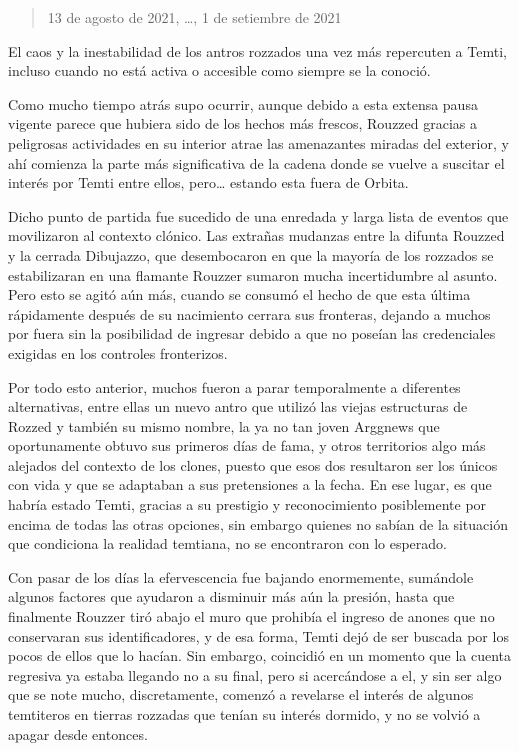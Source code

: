 \documentclass[
  spanish,
]{book}
\begin{document}
\begin{quote}
13 de agosto de 2021, \ldots, 1 de setiembre de 2021
\end{quote}

El caos y la inestabilidad de los antros rozzados una vez más repercuten a Temti, incluso cuando no está activa o accesible como siempre se la conoció.

Como mucho tiempo atrás supo ocurrir, aunque debido a esta extensa pausa vigente parece que hubiera sido de los hechos más frescos, Rouzzed gracias a peligrosas actividades en su interior atrae las amenazantes miradas del exterior, y ahí comienza la parte más significativa de la cadena donde se vuelve a suscitar el interés por Temti entre ellos, pero\ldots{} estando esta fuera de Orbita.

Dicho punto de partida fue sucedido de una enredada y larga lista de eventos que movilizaron al contexto clónico. Las extrañas mudanzas entre la difunta Rouzzed y la cerrada Dibujazzo, que desembocaron en que la mayoría de los rozzados se estabilizaran en una flamante Rouzzer sumaron mucha incertidumbre al asunto. Pero esto se agitó aún más, cuando se consumó el hecho de que esta última rápidamente después de su nacimiento cerrara sus fronteras, dejando a muchos por fuera sin la posibilidad de ingresar debido a que no poseían las credenciales exigidas en los controles fronterizos.

Por todo esto anterior, muchos fueron a parar temporalmente a diferentes alternativas, entre ellas un nuevo antro que utilizó las viejas estructuras de Rozzed y también su mismo nombre, la ya no tan joven Arggnews que oportunamente obtuvo sus primeros días de fama, y otros territorios algo más alejados del contexto de los clones, puesto que esos dos resultaron ser los únicos con vida y que se adaptaban a sus pretensiones a la fecha. En ese lugar, es que habría estado Temti, gracias a su prestigio y reconocimiento posiblemente por encima de todas las otras opciones, sin embargo quienes no sabían de la situación que condiciona la realidad temtiana, no se encontraron con lo esperado.

Con pasar de los días la efervescencia fue bajando enormemente, sumándole algunos factores que ayudaron a disminuir más aún la presión, hasta que finalmente Rouzzer tiró abajo el muro que prohibía el ingreso de anones que no conservaran sus identificadores, y de esa forma, Temti dejó de ser buscada por los pocos de ellos que lo hacían.
Sin embargo, coincidió en un momento que la cuenta regresiva ya estaba llegando no a su final, pero si acercándose a el, y sin ser algo que se note mucho, discretamente, comenzó a revelarse el interés de algunos temtiteros en tierras rozzadas que tenían su interés dormido, y no se volvió a apagar desde entonces.
\end{document}
